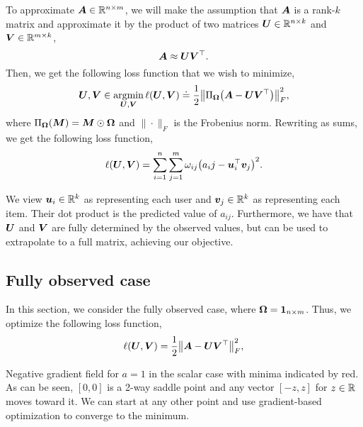 To approximate $\bm{A} \in \mathbb{R}^{n \times m}$, we will make the assumption that $\bm{A}$ is a
rank-$k$ matrix and approximate it by the product of two matrices $\bm{U} \in \mathbb{R}^{n \times k}$ and
$\bm{V} \in \mathbb{R}^{m \times k}$, \[
    \bm{A} \approx \bm{U} \bm{V}^\top.
\]
Then, we get the following loss function that we wish to minimize, \[
    \mat{U}, \mat{V} \in \argmin_{\mat{U}, \mat{V}} \ell(\mat{U}, \mat{V}) \doteq \frac{1}{2} \lft\| \Pi_{\mat{\Omega}} \lft( \mat{A} - \mat{U}\transpose{\mat{V}} \rgt) \rgt\|_F^2,
\]
where $\Pi_{\bm{\Omega}}(\bm{M}) = \bm{M} \odot \bm{\Omega}$ and $\| \cdot \|_F$ is the
Frobenius norm. Rewriting as sums, we get the following loss function, \[
    \ell(\mat{U}, \mat{V}) = \sum_{i=1}^{n} \sum_{j=1}^{m} \omega_{ij} \lft( a_ij - \transpose{\vec{u}_i} \vec{v}_j \rgt)^2.
\]

\begin{important}
    We view $\bm{u}_i \in \mathbb{R}^k$ as representing each user and $\bm{v}_j \in \mathbb{R}^k$ as
    representing each item. Their dot product is the predicted value of $a_{ij}$. Furthermore,
    we have that $\bm{U}$ and $\bm{V}$ are fully determined by the observed values, but can be used
    to extrapolate to a full matrix, achieving our objective.
\end{important}

\subsection{Fully observed case}

In this section, we consider the fully observed case, where $\bm{\Omega} = \bm{1}_{n \times m}$.
Thus, we optimize \wrt the following loss function, \[
    \ell(\mat{U}, \mat{V}) = \frac{1}{2} \lft\| \mat{A} - \mat{U}\transpose{\mat{V}} \rgt\|_F^2,
\]

\begin{marginfigure}
    \centering
    \caption{Negative gradient field for $a=1$ in the scalar case with minima indicated by red. As can be seen, $[0,0]$ is a 2-way saddle point and any vector $[-z,z]$ for $z\in\mathbb{R}$ moves toward it. We can start at any other point and use gradient-based optimization to converge to the minimum.}
    \label{fig:grad-field}
\end{marginfigure}

